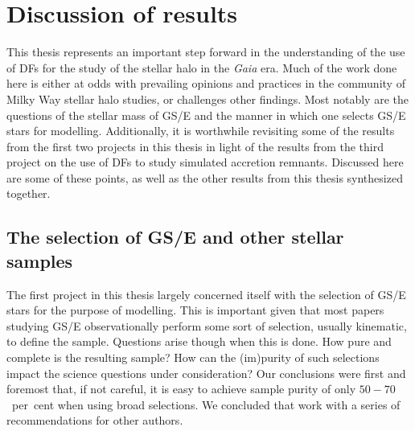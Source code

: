 \section{Discussion of results}

This thesis represents an important step forward in the understanding of the use of DFs for the study of the stellar halo in the \textit{Gaia} era. Much of the work done here is either at odds with prevailing opinions and practices in the community of Milky Way stellar halo studies, or challenges other findings. Most notably are the questions of the stellar mass of GS/E and the manner in which one selects GS/E stars for modelling. Additionally, it is worthwhile revisiting some of the results from the first two projects in this thesis in light of the results from the third project on the use of DFs to study simulated accretion remnants. Discussed here are some of these points, as well as the other results from this thesis synthesized together.


\subsection{The selection of GS/E and other stellar samples}

The first project in this thesis largely concerned itself with the selection of GS/E stars for the purpose of modelling. This is important given that most papers studying GS/E observationally perform some sort of selection, usually kinematic, to define the sample. Questions arise though when this is done. How pure and complete is the resulting sample? How can the (im)purity of such selections impact the science questions under consideration? Our conclusions were first and foremost that, if not careful, it is easy to achieve sample purity of only $50-70$~per~cent when using broad selections. We concluded that work with a series of recommendations for other authors.

